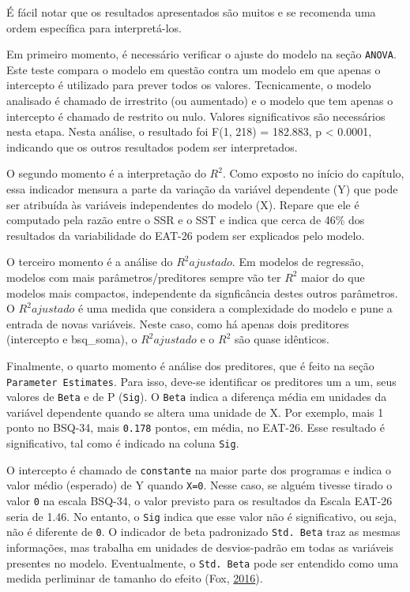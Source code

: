\documentclass[
]{book}
\begin{document}
É fácil notar que os resultados apresentados são muitos e se recomenda
uma ordem específica para interpretá-los.

Em primeiro momento, é necessário verificar o ajuste do modelo na seção
\texttt{ANOVA}. Este teste compara o modelo em questão contra um modelo
em que apenas o intercepto é utilizado para prever todos os valores.
Tecnicamente, o modelo analisado é chamado de irrestrito (ou aumentado)
e o modelo que tem apenas o intercepto é chamado de restrito ou nulo.
Valores significativos são necessários nesta etapa. Nesta análise, o
resultado foi F(1, 218) = 182.883, p \textless{} 0.0001, indicando que
os outros resultados podem ser interpretados.

O segundo momento é a interpretação do \(R^2\). Como exposto no início
do capítulo, essa indicador mensura a parte da variação da variável
dependente (Y) que pode ser atribuída às variáveis independentes do
modelo (X). Repare que ele é computado pela razão entre o SSR e o SST e
indica que cerca de 46\% dos resultados da variabilidade do EAT-26 podem
ser explicados pelo modelo.

O terceiro momento é a análise do \(R^2 ajustado\). Em modelos de
regressão, modelos com mais parâmetros/preditores sempre vão ter \(R^2\)
maior do que modelos mais compactos, independente da signficância destes
outros parâmetros. O \(R^2 ajustado\) é uma medida que considera a
complexidade do modelo e pune a entrada de novas variáveis. Neste caso,
como há apenas dois preditores (intercepto e bsq\_soma), o
\(R^2 ajustado\) e o \(R^2\) são quase idênticos.

Finalmente, o quarto momento é análise dos preditores, que é feito na
seção \texttt{Parameter\ Estimates}. Para isso, deve-se identificar os
preditores um a um, seus valores de \texttt{Beta} e de P (\texttt{Sig}).
O \texttt{Beta} indica a diferença média em unidades da variável
dependente quando se altera uma unidade de X. Por exemplo, mais 1 ponto
no BSQ-34, mais \texttt{0.178} pontos, em média, no EAT-26. Esse
resultado é significativo, tal como é indicado na coluna \texttt{Sig}.

O intercepto é chamado de \texttt{constante} na maior parte dos
programas e indica o valor médio (esperado) de Y quando \texttt{X=0}.
Nesse caso, se alguém tivesse tirado o valor \texttt{0} na escala
BSQ-34, o valor previsto para os resultados da Escala EAT-26 seria de
1.46. No entanto, o \texttt{Sig} indica que esse valor não é
significativo, ou seja, não é diferente de \texttt{0}. O indicador de
beta padronizado \texttt{Std.\ Beta} traz as mesmas informações, mas
trabalha em unidades de desvios-padrão em todas as variáveis presentes
no modelo. Eventualmente, o \texttt{Std.\ Beta} pode ser entendido como
uma medida perliminar de tamanho do efeito (Fox,
\protect\hyperlink{ref-fox2016}{2016}).
\end{document}
